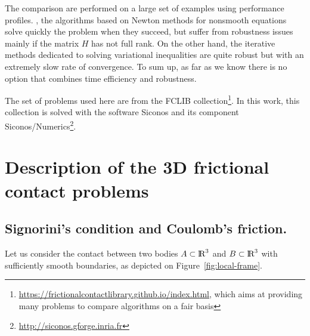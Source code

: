 The comparison are performed on a large set of examples using performance profiles.
, the algorithms based on Newton methods for nonsmooth equations solve quickly the problem when they succeed, but suffer from robustness issues mainly if the matrix $H$ has not full rank. On the other hand, the
iterative methods dedicated to solving variational inequalities are quite robust but with an extremely slow rate of convergence. To sum up, as far as we know there is no option that combines time efficiency and robustness.
{The set of problems used here are from the FCLIB collection\footnote{\url{https://frictionalcontactlibrary.github.io/index.html}, which aims at providing many problems to compare algorithms on a fair basis}.  In this work, this collection is solved with the software {\sc Siconos} and its component {\sc Siconos/Numerics}\footnote{\url{http://siconos.gforge.inria.fr}}\citep{Acary.Bremond.Huber.Perignon2015}.


\clearpage
\section{Description of the 3D frictional contact problems}
\label{sec:description}
\subsection{Signorini's condition and Coulomb's friction.}

Let us consider the contact between two  bodies $A \subset  \mbox{l\hspace{ -.15em}R}^3$ and $B \subset \mbox{l\hspace{ -.15em}R}^3$ with sufficiently smooth boundaries, as depicted on Figure~\ref{fig:local-frame}.
\begin{figure}[htb]
  \centering
\end{figure}}
